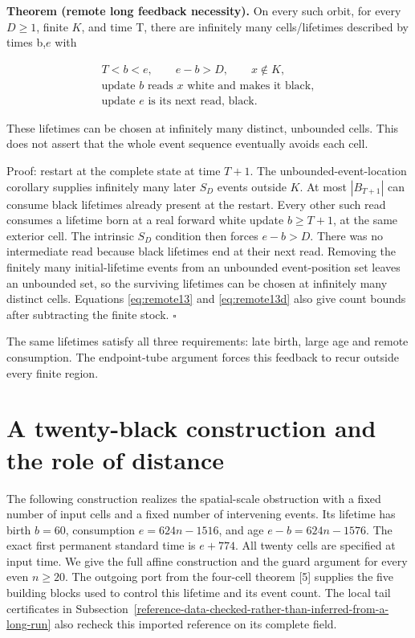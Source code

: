 \documentclass[
  11pt,
]{article}
\begin{document}
\textbf{Theorem (remote long feedback necessity).} On every such
orbit, for every $D\ge1$, finite \(K\), and time T, there are
infinitely many cells/lifetimes described by times b,\(e\) with

\begin{equation}\label{eq:remote14}
\begin{gathered}T<b<e,\qquad e-b>D,\qquad x\notin K,\\\text{update }b\text{ reads }x\text{ white and makes it black},\\\text{update }e\text{ is its next read, black}.\end{gathered}
\end{equation}

These lifetimes can be chosen at infinitely many distinct, unbounded
cells. This does not assert that the whole event sequence eventually
avoids each cell.

Proof: restart at the complete state at time \(T+1\). The unbounded-event-location corollary supplies
infinitely many later $S_D$ events outside \(K\). At most
$|B_{T+1}|$ can consume black lifetimes already present
at the restart. Every other such read consumes a lifetime born at a real
forward white update $b\ge T+1$, at the same exterior cell. The
intrinsic $S_D$ condition then forces $e-b>D$. There was no
intermediate read because black lifetimes end at their next read.
Removing the finitely many initial-lifetime events from an unbounded
event-position set leaves an unbounded set, so the surviving lifetimes
can be chosen at infinitely many distinct cells. Equations \eqref{eq:remote13}
and \eqref{eq:remote13d} also give count bounds after subtracting the finite
stock. \(\square\)

The same lifetimes satisfy all three requirements: late birth, large age
and remote consumption. The endpoint-tube argument forces this feedback to
recur outside every finite region.
 

\section{A twenty-black construction and the role of
distance}\label{a-twenty-black-construction-and-the-role-of-distance}

The following construction realizes the spatial-scale obstruction with a
fixed number of input cells and a fixed number of intervening events.
Its lifetime has birth \(b=60\), consumption \(e=624n-1516\), and age
\(e-b=624n-1576\). The exact first permanent standard time is
\(e+774\). All twenty cells are specified at input time. We give the
full affine construction and the guard argument for every even
\(n\ge20\). The outgoing port from the four-cell theorem {[}5{]} supplies
the five building blocks used to control this lifetime and its event count.
The local tail certificates in Subsection~\ref{reference-data-checked-rather-than-inferred-from-a-long-run}
also recheck this imported reference on its complete field.
\end{document}
